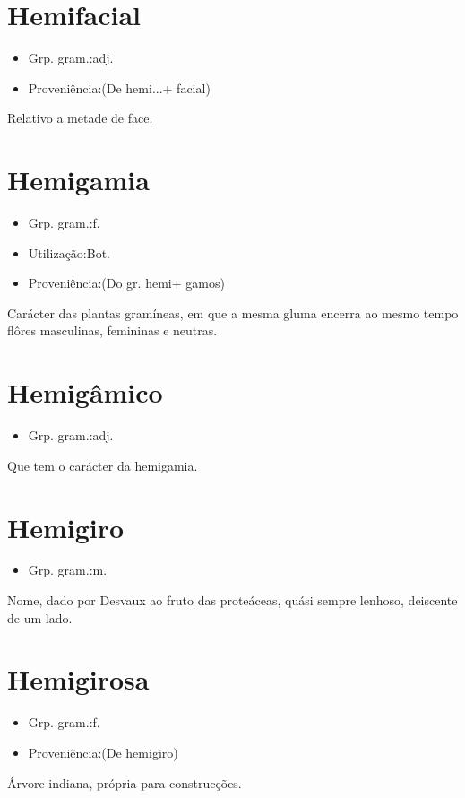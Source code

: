 \documentclass{article}
\begin{document}
\section{Hemifacial}
\begin{itemize}
\item {Grp. gram.:adj.}
\end{itemize}
\begin{itemize}
\item {Proveniência:(De \textunderscore hemi...\textunderscore  + \textunderscore facial\textunderscore )}
\end{itemize}
Relativo a metade de face.
\section{Hemigamia}
\begin{itemize}
\item {Grp. gram.:f.}
\end{itemize}
\begin{itemize}
\item {Utilização:Bot.}
\end{itemize}
\begin{itemize}
\item {Proveniência:(Do gr. \textunderscore hemi\textunderscore  + \textunderscore gamos\textunderscore )}
\end{itemize}
Carácter das plantas gramíneas, em que a mesma gluma encerra ao mesmo tempo flôres masculinas, femininas e neutras.
\section{Hemigâmico}
\begin{itemize}
\item {Grp. gram.:adj.}
\end{itemize}
Que tem o carácter da hemigamia.
\section{Hemigiro}
\begin{itemize}
\item {Grp. gram.:m.}
\end{itemize}
Nome, dado por Desvaux ao fruto das proteáceas, quási sempre lenhoso, deiscente de um lado.
\section{Hemigirosa}
\begin{itemize}
\item {Grp. gram.:f.}
\end{itemize}
\begin{itemize}
\item {Proveniência:(De \textunderscore hemigiro\textunderscore )}
\end{itemize}
Árvore indiana, própria para construcções.
\end{document}
